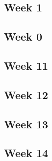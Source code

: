 \documentclass[11pt]{article}
\begin{document}
    \subsection*{Week 1}
    \subsection*{Week 0}
    \subsection*{Week 11}
    \subsection*{Week 12}
    \subsection*{Week 13}
    \subsection*{Week 14}
\end{document}
